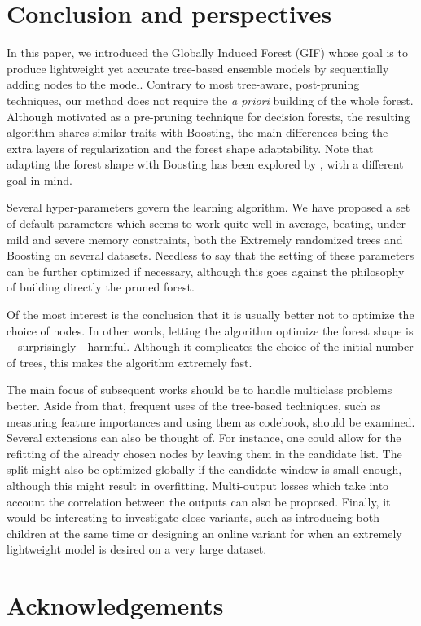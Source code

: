 \documentclass{article}
\begin{document}

\section{Conclusion and perspectives}
\label{sec:conclusion}

In this paper, we introduced the Globally Induced Forest (GIF) whose goal is to
produce lightweight yet accurate tree-based ensemble models by sequentially
adding nodes to the model. Contrary to most tree-aware, post-pruning techniques,
our method does not require the {\it a priori} building of the whole
forest. Although motivated as a pre-pruning technique for decision forests, the
resulting algorithm shares similar traits with Boosting, the main differences
being the extra layers of regularization and the forest shape adaptability. Note
that adapting the forest shape with Boosting has been explored by
\citet{johnson2014regforest}, with a different goal in mind.

Several hyper-parameters govern the learning algorithm. We have proposed a set
of default parameters which seems to work quite well in average, beating, under
mild and severe memory constraints, both the Extremely randomized trees and
Boosting on several datasets. Needless to say that the setting of these
parameters can be further optimized if necessary, although this goes against the
philosophy of building directly the pruned forest.

Of the most interest is the conclusion that it is usually better not to optimize
the choice of nodes. In other words, letting the algorithm optimize the forest
shape is---surprisingly---harmful. Although it complicates the choice of the
initial number of trees, this makes the algorithm extremely fast.

The main focus of subsequent works should be to handle multiclass problems
better. Aside from that, frequent uses of the tree-based techniques, such as
measuring feature importances and using them as codebook, should be examined.
Several extensions can also be thought of. For instance, one could allow for the
refitting of the already chosen nodes by leaving them in the candidate list. The
split might also be optimized globally if the candidate window is small enough,
although this might result in overfitting. Multi-output losses which take into
account the correlation between the outputs can also be proposed.  Finally, it 
would be interesting to investigate close variants, such as introducing both 
children at the same time or designing an online variant for when an
extremely lightweight model is desired on a very large dataset.

\section*{Acknowledgements} 



\end{document}
